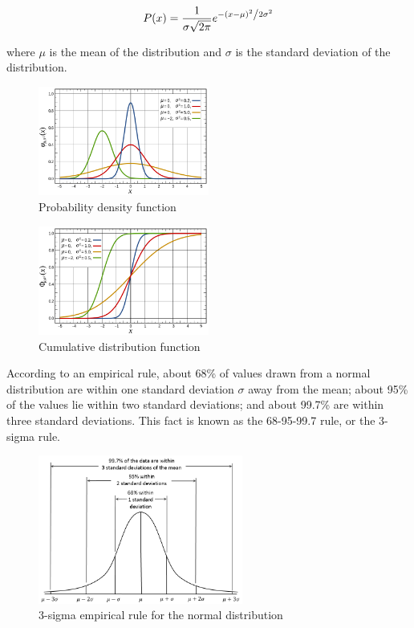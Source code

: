 \[P(x) = \frac{1}{{\sigma \sqrt {2\pi } }}e^{{{ - \left( {x - \mu } \right)^2 } \mathord{\left/ {\vphantom {{ - \left( {x - \mu } \right)^2 } {2\sigma ^2 }}} \right. \kern-\nulldelimiterspace} {2\sigma ^2 }}}\]

where \(\mu\) is the mean of the distribution and \(\sigma\) is the standard deviation of the distribution.

\begin{figure}[H]
  \centering
  \includegraphics[width=0.5\textwidth]{figures/gauss_1.png}
  \caption{Probability density function}
\end{figure}

\begin{figure}[H]
  \centering
  \includegraphics[width=0.5\textwidth]{figures/gauss_2.png}
  \caption{Cumulative distribution function}
\end{figure}

According to an empirical rule, about 68\% of values drawn from a normal distribution are within one standard deviation \(\sigma\) away from the mean; 
about 95\% of the values lie within two standard deviations; and about 99.7\% are within three standard deviations. This fact is known as the 68-95-99.7 
rule, or the 3-sigma rule.

\begin{figure}[H]
  \centering
  \includegraphics[width=0.6\textwidth]{figures/Empirical_Rule.PNG}
  \caption{3-sigma empirical rule for the normal distribution}
\end{figure}

